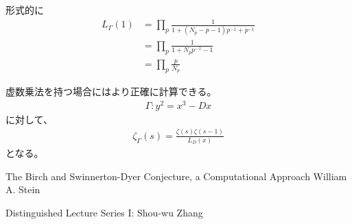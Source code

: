 \documentclass{jsarticle}
\begin{document}
形式的に
\begin{align*}
L_\Gamma(1)&=\prod_p\frac{1}{1+(N_p-p-1)p^{-1}+p^{-1}}\\
&=\prod_p\frac{1}{1+N_pp^{-1}-1}\\
&=\prod_p\frac{p}{N_p}
\end{align*}


虚数乗法を持つ場合にはより正確に計算できる。
\begin{align*}
\Gamma:y^2=x^3-Dx
\end{align*}
に対して、
\begin{align*}
\zeta_{\Gamma}(s)=\frac{\zeta(s)\zeta(s-1)}{L_D(x)}
\end{align*}
となる。

The Birch and Swinnerton-Dyer Conjecture, a Computational Approach
William A. Stein

Distinguished Lecture Series I: Shou-wu Zhang
\end{document}
